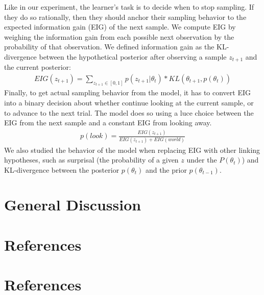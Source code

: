 \documentclass[10pt, letterpaper]{article}
\begin{document}
Like in our experiment, the learner's task is to decide when to stop
sampling. If they do so rationally, then they should anchor their
sampling behavior to the expected information gain (EIG) of the next
sample. We compute EIG by weighing the information gain from each
possible next observation by the probability of that observation. We
defined information gain as the KL-divergence between the hypothetical
posterior after observing a sample \(z_{t+1}\) and the current
posterior: \begin{eqnarray}
EIG(z_{t+1}) = \sum_{z_{t+1} \in [0,1]} p(z_{t+1}|\theta_t) * KL(\theta_{t+1}, p(\theta_t))
\end{eqnarray} Finally, to get actual sampling behavior from the model,
it has to convert EIG into a binary decision about whether continue
looking at the current sample, or to advance to the next trial. The
model does so using a luce choice between the EIG from the next sample
and a constant EIG from looking away. \begin{eqnarray}
p(look) = \frac{EIG(z_{t+1})}{EIG(z_{t+1})+EIG(world)}
\end{eqnarray} We also studied the behavior of the model when replacing
EIG with other linking hypotheses, such as surprisal (the probability of
a given \(z\) under the \(P(\theta_t)\)) and KL-divergence between the
posterior \(p(\theta_t)\) and the prior \(p(\theta_{t-1})\).

\hypertarget{general-discussion}{%
\section{General Discussion}\label{general-discussion}}

\hypertarget{references}{%
\section{References}\label{references}}

\hypertarget{references-1}{%
\section{References}\label{references-1}}

\setlength{\parindent}{-0.1in} 
\setlength{\leftskip}{0.125in}

\noindent


\end{document}
